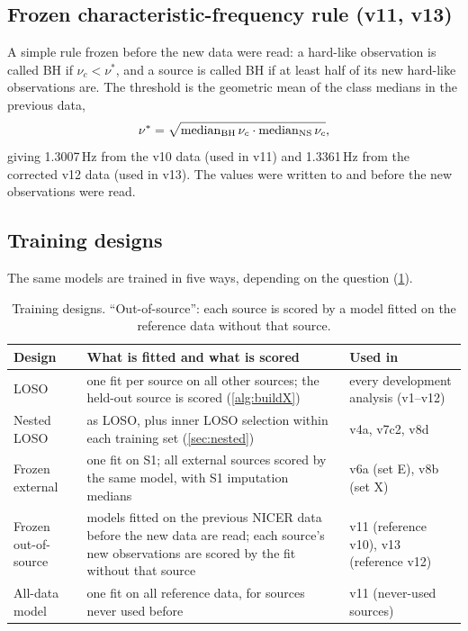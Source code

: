 \subsection{Frozen characteristic-frequency rule (v11, v13)}\label{sec:nurule}
A simple rule frozen before the new data were read: a hard-like observation is called BH if $\nu_c<\nu^\ast$, and a source is
called BH if at least half of its new hard-like observations are. The threshold is the geometric mean of the class medians
in the previous data,
\begin{equation}
\nu^\ast=\sqrt{\operatorname{median}_\mathrm{BH}\nu_c\cdot\operatorname{median}_\mathrm{NS}\nu_c},\label{eq:nustar}
\end{equation}
giving 1.3007\,Hz from the v10 data (used in v11) and 1.3361\,Hz from the corrected v12 data (used in v13).
The values were written to  and  before the new
observations were read.

\subsection{Training designs}\label{sec:designs}
The same models are trained in five ways, depending on the question (\cref{tab:designs}).

\begin{table}[htbp]
\centering\small
\caption{Training designs. ``Out-of-source'': each source is scored by a model fitted on the reference data without that source.}\label{tab:designs}
\begin{tabularx}{\textwidth}{@{}>{\raggedright\arraybackslash}p{3.2cm}>{\raggedright\arraybackslash}X>{\raggedright\arraybackslash}p{4.2cm}@{}}
\toprule
Design & What is fitted and what is scored & Used in \\
\midrule
LOSO & one fit per source on all other sources; the held-out source is scored (\cref{alg:buildX}) & every development analysis (v1--v12) \\
Nested LOSO & as LOSO, plus inner LOSO selection within each training set (\cref{sec:nested}) & v4a, v7c2, v8d \\
Frozen external & one fit on S1; all external sources scored by the same model, with S1 imputation medians & v6a (set E), v8b (set X) \\
Frozen out-of-source & models fitted on the previous NICER data before the new data are read; each source's new observations are scored by the fit without that source & v11 (reference v10), v13 (reference v12) \\
All-data model & one fit on all reference data, for sources never used before & v11 (never-used sources) \\
\bottomrule
\end{tabularx}
\end{table}
